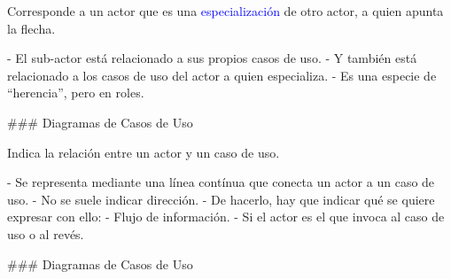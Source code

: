 \newline

\columnsbegin


\centering{}

 Corresponde a un actor que es una \textcolor{blue}{especialización} de
otro actor, a quien apunta la flecha.

- El sub-actor está relacionado a sus propios casos de uso.
- Y también está relacionado a los casos de uso del actor a quien especializa.
- Es una especie de ``herencia'', pero en roles.

\columnsend

### Diagramas de Casos de Uso

\newline

\columnsbegin


\centering{}

 Indica la relación entre un actor y un caso de uso.

- Se representa mediante una línea contínua que conecta un actor a un caso de uso.
- No se suele indicar dirección.
- De hacerlo, hay que indicar qué se quiere expresar con ello:
    - Flujo de información.
    - Si el actor es el que invoca al caso de uso o al revés.

\columnsend

### Diagramas de Casos de Uso

\newline

\columnsbegin


\centering{}

